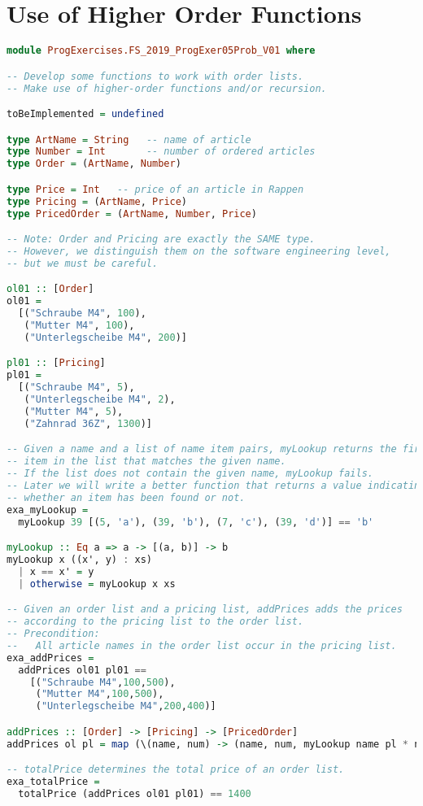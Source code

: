 \section{Use of Higher Order Functions}

\begin{lstlisting}[language=Haskell]
module ProgExercises.FS_2019_ProgExer05Prob_V01 where

-- Develop some functions to work with order lists.
-- Make use of higher-order functions and/or recursion.

toBeImplemented = undefined

type ArtName = String   -- name of article
type Number = Int       -- number of ordered articles
type Order = (ArtName, Number)

type Price = Int   -- price of an article in Rappen
type Pricing = (ArtName, Price)
type PricedOrder = (ArtName, Number, Price)

-- Note: Order and Pricing are exactly the SAME type.
-- However, we distinguish them on the software engineering level,
-- but we must be careful.

ol01 :: [Order]
ol01 =
  [("Schraube M4", 100),
   ("Mutter M4", 100),
   ("Unterlegscheibe M4", 200)]

pl01 :: [Pricing]
pl01 =
  [("Schraube M4", 5),
   ("Unterlegscheibe M4", 2),
   ("Mutter M4", 5),
   ("Zahnrad 36Z", 1300)]

-- Given a name and a list of name item pairs, myLookup returns the first
-- item in the list that matches the given name.
-- If the list does not contain the given name, myLookup fails.
-- Later we will write a better function that returns a value indicating
-- whether an item has been found or not.
exa_myLookup =
  myLookup 39 [(5, 'a'), (39, 'b'), (7, 'c'), (39, 'd')] == 'b'

myLookup :: Eq a => a -> [(a, b)] -> b
myLookup x ((x', y) : xs)
  | x == x' = y
  | otherwise = myLookup x xs 

-- Given an order list and a pricing list, addPrices adds the prices
-- according to the pricing list to the order list.
-- Precondition:
--   All article names in the order list occur in the pricing list.
exa_addPrices =
  addPrices ol01 pl01 ==
    [("Schraube M4",100,500),
     ("Mutter M4",100,500),
     ("Unterlegscheibe M4",200,400)]

addPrices :: [Order] -> [Pricing] -> [PricedOrder]
addPrices ol pl = map (\(name, num) -> (name, num, myLookup name pl * num)) ol

-- totalPrice determines the total price of an order list.
exa_totalPrice =
  totalPrice (addPrices ol01 pl01) == 1400


\end{lstlisting}

